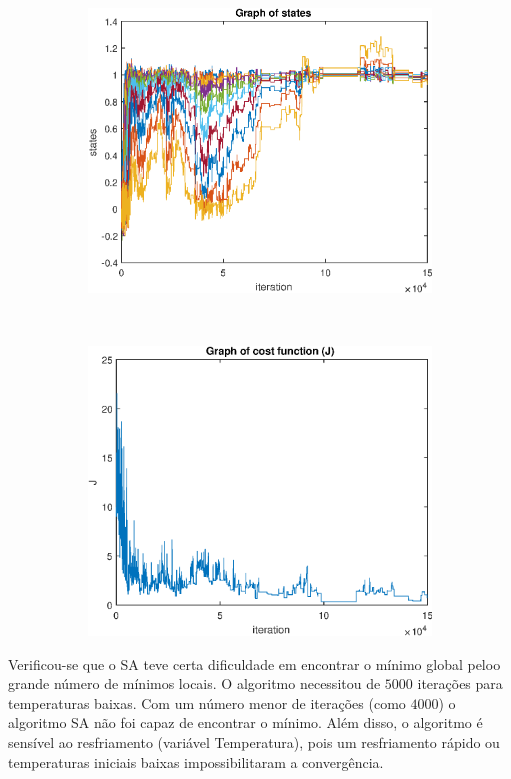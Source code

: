 \documentclass[12pt]{article}
\newenvironment{exercise}[2][Exercício]{\begin{trivlist}
\item[\hskip \labelsep {\bfseries #1}\hskip \labelsep {\bfseries #2.}]}{\end{trivlist}}
\begin{document}
\begin{exercise}{3}
\begin{figure}[H]
    \centering
    \begin{subfigure}[b]{0.45\textwidth}
        \includegraphics[width=\textwidth]{figs/ex3_states.eps}
    \end{subfigure}
    ~ 
    \begin{subfigure}[b]{0.45\textwidth}
        \includegraphics[width=\textwidth]{figs/ex3_j.eps}
    \end{subfigure}
\end{figure}

Verificou-se que o SA teve certa dificuldade em encontrar o mínimo global peloo
grande número de mínimos locais. O algoritmo necessitou de $5000$ iterações
para temperaturas baixas. Com um número menor de iterações (como $4000$) o
algoritmo SA não foi capaz de encontrar o mínimo. Além disso, o algoritmo é
sensível ao resfriamento (variável Temperatura), pois um resfriamento rápido ou
temperaturas iniciais baixas impossibilitaram a convergência. 

\end{exercise}
 
\end{document}
